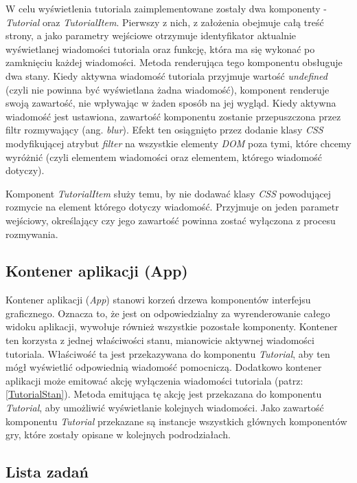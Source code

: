 \documentclass[12pt,a4paper,polish,thesis]{dcsbook}
\begin{document}
{	W celu wyświetlenia tutoriala zaimplementowane zostały dwa komponenty - \textit{Tutorial} oraz \textit{TutorialItem}. Pierwszy z nich, z założenia obejmuje całą treść strony, a jako parametry wejściowe otrzymuje identyfikator aktualnie wyświetlanej wiadomości tutoriala oraz funkcję, która ma się wykonać po zamknięciu każdej wiadomości. Metoda renderująca tego komponentu obsługuje dwa stany. Kiedy aktywna wiadomość tutoriala przyjmuje wartość \textit{undefined} (czyli nie powinna być wyświetlana żadna wiadomość), komponent renderuje swoją zawartość, nie wpływając w żaden sposób na jej wygląd. Kiedy aktywna wiadomość jest ustawiona, zawartość komponentu zostanie przepuszczona przez filtr rozmywający (ang. \textit{blur}). Efekt ten osiągnięto przez dodanie klasy \textit{CSS} modyfikującej atrybut \textit{filter} na wszystkie elementy \textit{DOM} poza tymi, które chcemy wyróżnić (czyli elementem wiadomości oraz elementem, którego wiadomość dotyczy).
	
	Komponent \textit{TutorialItem} służy temu, by nie dodawać klasy \textit{CSS} powodującej rozmycie na element którego dotyczy wiadomość. Przyjmuje on jeden parametr wejściowy, określający czy jego zawartość powinna zostać wyłączona z procesu rozmywania.
	
	\subsection{Kontener aplikacji (App)}
	
	Kontener aplikacji (\textit{App}) stanowi korzeń drzewa komponentów interfejsu graficznego. Oznacza to, że jest on odpowiedzialny za wyrenderowanie całego widoku aplikacji, wywołuje również wszystkie pozostałe komponenty. Kontener ten korzysta z jednej właściwości stanu, mianowicie aktywnej wiadomości tutoriala. Właściwość ta jest przekazywana do komponentu \textit{Tutorial}, aby ten mógł wyświetlić odpowiednią wiadomość pomocniczą. Dodatkowo kontener aplikacji może emitować akcję wyłączenia wiadomości tutoriala (patrz: \ref{TutorialStan}). Metoda emitująca tę akcję jest przekazana do komponentu \textit{Tutorial}, aby umożliwić wyświetlanie kolejnych wiadomości. Jako zawartość komponentu \textit{Tutorial} przekazane są instancje wszystkich głównych komponentów gry, które zostały opisane w kolejnych podrodziałach.
	
	\subsection{Lista zadań}
	
}
\end{document}
